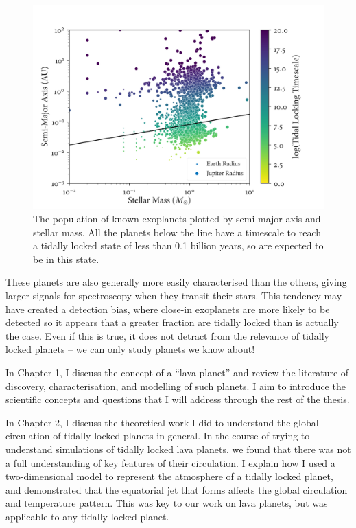 \clearpage
\begin{figure}
  \centering
    \includegraphics[width=1.0\textwidth]{figures/introduction/tide-locked-population.pdf}
    \caption{The population of known exoplanets plotted by semi-major axis and stellar mass. All the planets below the line have a timescale to reach a tidally locked state of less than 0.1 billion years, so are expected to be in this state.}
    \label{fig:tide-locked-population}
\end{figure}
\clearpage

 These planets are also generally more easily characterised than the others, giving larger signals for spectroscopy when they transit their stars. This tendency may have created a detection bias, where close-in exoplanets are more likely to be detected so it appears that a greater fraction are tidally locked than is actually the case. Even if this is true, it does not detract from the relevance of tidally locked planets -- we can only study planets we know about!

In Chapter 1, I discuss the concept of a ``lava planet'' and review the literature of discovery, characterisation, and modelling of such planets. I aim to introduce the scientific concepts and questions that I will address through the rest of the thesis.

In Chapter 2, I discuss the theoretical work I did to understand the global circulation of tidally locked planets in general. In the course of trying to understand simulations of tidally locked lava planets, we found that there was not a full understanding of key features of their circulation. I explain how I used a two-dimensional model to represent the atmosphere of a tidally locked planet, and demonstrated that the equatorial jet that forms affects the global circulation and temperature pattern. This was key to our work on lava planets, but was applicable to any tidally locked planet.

